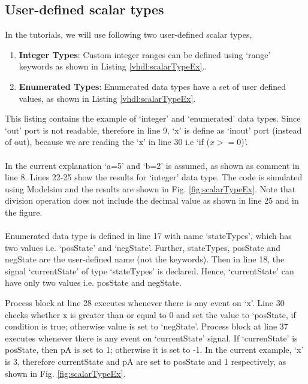 \subsection{User-defined scalar types}
In the tutorials, we will use following two user-defined scalar types, 
\begin{enumerate}
	\item \textbf{Integer Types}: Custom integer ranges can be defined using `range' keywords as shown in Listing \ref {vhdl:scalarTypeEx}..
	
	\item \textbf{Enumerated Types}: Enumerated data types have a set of user defined values, as shown in Listing \ref {vhdl:scalarTypeEx}. 
	
\end{enumerate} 

\begin{explanation}
	This listing contains the example of `integer' and `enumerated' data types. Since `out' port is not readable, therefore in line 9, `x' is define as `inout' port (instead of out), because we are reading the `x' in line 30 i.e `if ($x>=0$)'.
	\\ \\
	In the current explanation `a=5' and `b=2' is assumed, as shown as comment in line 8. Lines 22-25 show the results for `integer' data type. The code is simulated using Modelsim and the results are shown in Fig. \ref{fig:scalarTypeEx}.  Note that division operation does not include the decimal value as shown in line 25 and in the figure.
	\\ \\
	Enumerated data type is defined in line 17 with name `stateTypes', which has two values i.e. `posState' and `negState'. Further, stateTypes, posState and negState are the user-defined name (not the keywords). Then in line 18, the signal `currentState' of type `stateTypes' is declared. Hence, `currentState' can have only two values i.e. posState and negState. 
	
	Process block at line 28 executes whenever there is any event on `x'. Line 30 checks whether x is greater than or equal to 0 and set the value to `posState, if condition is true; otherwise value is set to `negState'. Process block at line 37 executes whenever there is any event on `currentState' signal. If `currenState' is posState, then pA is set to 1; otherwise it is set to -1. In the current example, `x' is 3, therefore currentState and pA are set to posState and 1 respectively, as shown in Fig. \ref{fig:scalarTypeEx}.
	
	
\end{explanation}

